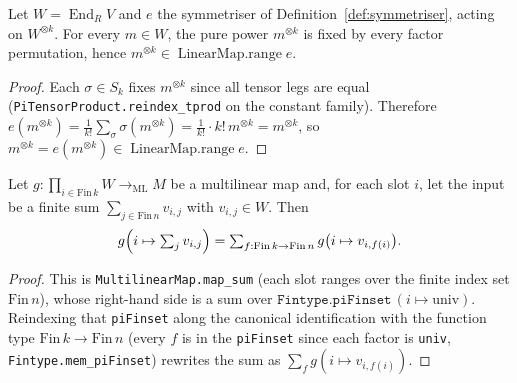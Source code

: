 \begin{lemma}
    \label{lem:power-is-symmetric}
    \leanok
    Let $W = \operatorname{End}_R V$ and $e$ the symmetriser of Definition~\ref{def:symmetriser}, acting on
    $W^{\otimes k}$. For every $m \in W$, the pure power $m^{\otimes k}$ is fixed by every
    factor permutation, hence $m^{\otimes k} \in \operatorname{LinearMap.range} e$.
\end{lemma}
\begin{proof}
    Each $\sigma \in S_k$ fixes $m^{\otimes k}$ since all tensor legs are equal
    (\texttt{PiTensorProduct.reindex\_tprod} on the constant family). Therefore
    $e(m^{\otimes k}) = \tfrac{1}{k!}\sum_\sigma \sigma(m^{\otimes k}) = \tfrac{1}{k!}\cdot k!\,
    m^{\otimes k} = m^{\otimes k}$, so $m^{\otimes k} = e(m^{\otimes k}) \in
    \operatorname{LinearMap.range} e$.
\end{proof}

\begin{lemma}
    \label{lem:multilinear-map-sum-expand}
    Let $g : \prod_{i \in \mathrm{Fin}\,k} W \to_{\mathrm{ML}} M$ be a multilinear map and, for each slot
    $i$, let the input be a finite sum $\sum_{j \in \mathrm{Fin}\,n} v_{i,j}$ with $v_{i,j} \in W$. Then
    \[
        g\Bigl(i \mapsto \textstyle\sum_{j} v_{i,j}\Bigr)
          = \sum_{f : \mathrm{Fin}\,k \to \mathrm{Fin}\,n} g\bigl(i \mapsto v_{i, f(i)}\bigr).
    \]
\end{lemma}
\begin{proof}
    This is \texttt{MultilinearMap.map\_sum} (each slot ranges over the finite index set
    $\mathrm{Fin}\,n$), whose right-hand side is a sum over $\texttt{Fintype.piFinset}\,(i \mapsto
    \mathrm{univ})$. Reindexing that \texttt{piFinset} along the canonical identification with the function
    type $\mathrm{Fin}\,k \to \mathrm{Fin}\,n$ (every $f$ is in the \texttt{piFinset} since each factor is
    \texttt{univ}, \texttt{Fintype.mem\_piFinset}) rewrites the sum as $\sum_{f} g(i \mapsto v_{i,f(i)})$.
\end{proof}

